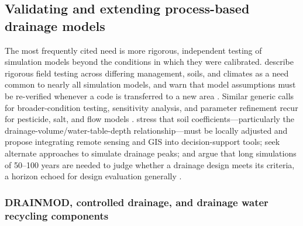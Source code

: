 \documentclass[11pt]{article}
\begin{document}
\subsection{Validating and extending process-based drainage models}

The most frequently cited need is more rigorous, independent testing of
simulation models beyond the conditions in which they were calibrated.
\textcite{Youssef2006} describe rigorous field testing across differing
management, soils, and climates as a need common to nearly all simulation
models, and warn that model assumptions must be re-verified whenever a code is
transferred to a new area \parencite{Kelleners2000}. Similar generic calls for
broader-condition testing, sensitivity analysis, and parameter refinement recur
for pesticide, salt, and flow models
\parencite{Branger2009,Hirekhan2007,Yang2008b,Xian2017}. \textcite{Yang2008b}
stress that soil coefficients---particularly the
drainage-volume/water-table-depth relationship---must be locally adjusted and
propose integrating remote sensing and GIS into decision-support tools;
\textcite{Xian2017} seek alternate approaches to simulate drainage peaks; and
\textcite{Mendez2004} argue that long simulations of 50--100 years are needed to
judge whether a drainage design meets its criteria, a horizon echoed for design
evaluation generally \parencite{Wang2006b,Ale2009,Malota2015,Häggblom2019}.

\subsubsection{DRAINMOD, controlled drainage, and drainage water recycling components}
\end{document}
